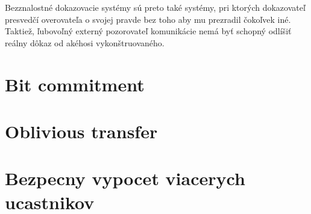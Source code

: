 Bezznalostné dokazovacie systémy sú preto také systémy, pri ktorých
dokazovateľ presvedčí overovateľa o svojej pravde bez toho aby mu
prezradil čokoľvek iné. Taktiež, ľubovoľný externý pozorovateľ
komunikácie nemá byť schopný odlíšiť reálny dôkaz od akéhosi
vykonštruovaného.



\section{Bit commitment}


\section{Oblivious transfer}

\section{Bezpecny vypocet viacerych ucastnikov}

